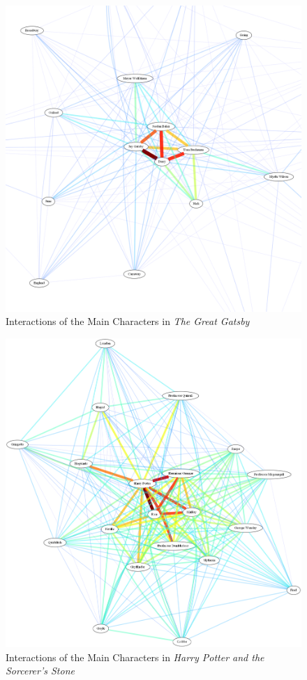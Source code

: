 \documentclass[twoside]{article}
\begin{document}
\begin{figure}
  \includegraphics[width=\textwidth]{img/gatsby_full}
  \caption{Interactions of the Main Characters in \emph{The Great Gatsby}\label{figure:gatsby_graph}}
\end{figure}

\begin{figure}
  \includegraphics[width=\textwidth]{img/harry_full}
  \caption{Interactions of the Main Characters in \emph{Harry Potter and the Sorcerer's Stone}\label{figure:harry_graph}}
\end{figure}
\end{document}
